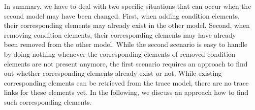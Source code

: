 In summary, we have to deal with two specific situations that can occur when the second model may have been changed.
First, when adding condition elements, their corresponding elements may already exist in the other model.
Second, when removing condition elements, their corresponding elements may have already been removed from the other model.
While the second scenario is easy to handle by doing nothing whenever the corresponding elements of removed condition elements are not present anymore, the first scenario requires an approach to find out whether corresponding elements already exist or not.
While existing corresponding elements can be retrieved from the trace model, there are no trace links for these elements yet.
In the following, we discuss an approach how to find such corresponding elements.




